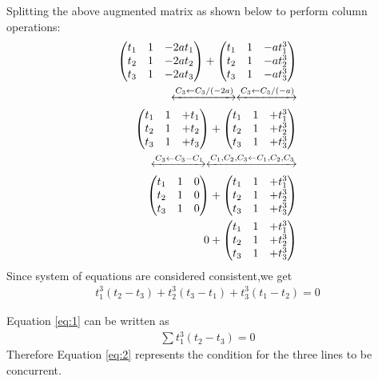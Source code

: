 \documentclass[journal,12pt,twocolumn]{IEEEtran}
\begin{document}
Splitting the above augmented matrix as shown below to perform 
column operations:
\begin{align}
\begin{split}
\begin{pmatrix}t_1&1&-2at_1\\t_2&1&-2at_2\\t_3&1&-2at_3\end{pmatrix}
+\begin{pmatrix}t_1&1&-at_1^3\\t_2&1&-at_2^3\\t_3&1&-at_3^3\end{pmatrix}\\
\xleftrightarrow[]{C_3\leftarrow {C_3/(-2a)}}
\xleftrightarrow[]{C_3 \leftarrow {C_3/(-a)}}\\  
\begin{pmatrix}t_1&1&+t_1\\t_2&1&+t_2\\t_3&1&+t_3\end{pmatrix}
+\begin{pmatrix}t_1&1&+t_1^3\\t_2&1&+t_2^3\\t_3&1&+t_3^3\end{pmatrix}\\
\xleftrightarrow[]{C_3 \leftarrow {C_3-C_1}}
\xleftrightarrow[]{C_1,C_2,C_3 \leftarrow {C_1,C_2,C_3}}\\
\begin{pmatrix}t_1&1&0\\t_2&1&0\\t_3&1&0\end{pmatrix}
+\begin{pmatrix}t_1&1&+t_1^3\\t_2&1&+t_2^3\\t_3&1&+t_3^3\end{pmatrix}\\
0+\begin{pmatrix}t_1&1&+t_1^3\\t_2&1&+t_2^3\\t_3&1&+t_3^3\end{pmatrix}
\end{split}
\end{align}
Since system of equations are considered consistent,we get
\begin{equation}
\begin{split}
t_1^3(t_2-t_3)+t_2^3(t_3-t_1)+t_3^3(t_1-t_2)=0
\end{split}
\label{eq:1}
\end{equation}

Equation \eqref{eq:1} can be written as 
\begin{equation}
\begin{split}
\sum{t_1^3(t_2-t_3)}=0
\label{eq:2}
\end{split}
\end{equation}
Therefore Equation \eqref{eq:2} represents the condition for the three lines to be concurrent.
\end{document}
